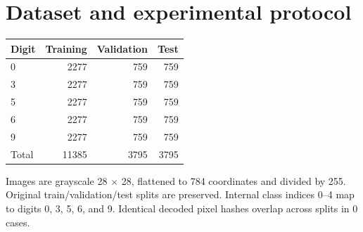 \documentclass[11pt,a4paper]{article}
\begin{document}
\section{Dataset and experimental protocol}

\begingroup\small\setlength{\tabcolsep}{5pt}

\begin{tabularx}{\linewidth}{Yrrr}

\toprule

\textbf{Digit} & \textbf{Training} & \textbf{Validation} & \textbf{Test} \\

\midrule

0 & 2277 & 759 & 759 \\

3 & 2277 & 759 & 759 \\

5 & 2277 & 759 & 759 \\

6 & 2277 & 759 & 759 \\

9 & 2277 & 759 & 759 \\

Total & 11385 & 3795 & 3795 \\

\bottomrule\end{tabularx}\endgroup\par\medskip

Images are grayscale 28 $\times$ 28, flattened to 784 coordinates and divided by 255. Original train/validation/test splits are preserved. Internal class indices 0--4 map to digits 0, 3, 5, 6, and 9. Identical decoded pixel hashes overlap across splits in 0 cases.


\begingroup\small\setlength{\tabcolsep}{5pt}
\end{document}
